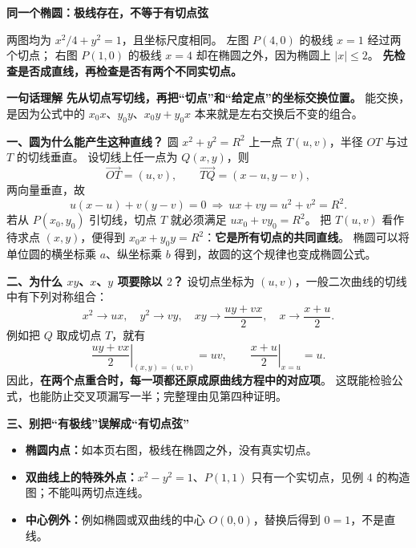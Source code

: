 \begin{explanationbox}
\textbf{\textcolor{CExplanation}{同一个椭圆：极线存在，不等于有切点弦}}

\begin{center}

\end{center}

两图均为 $x^2/4+y^2=1$，且坐标尺度相同。
左图 $P(4,0)$ 的极线 $x=1$ 经过两个切点；
右图 $P(1,0)$ 的极线 $x=4$ 却在椭圆之外，因为椭圆上 $|x|\le2$。
\textbf{先检查是否成直线，再检查是否有两个不同实切点。}

\medskip
\textbf{\textcolor{CExplanation}{一句话理解}}
\textbf{先从切点写切线，再把“切点”和“给定点”的坐标交换位置。}
能交换，是因为公式中的 $x_0x$、$y_0y$、$x_0y+y_0x$ 本来就是左右交换后不变的组合。

\medskip
\begin{minipage}{\linewidth}
\textbf{\textcolor{CExplanation}{一、圆为什么能产生这种直线？}}
圆 $x^2+y^2=R^2$ 上一点 $T(u,v)$，半径 $OT$ 与过 $T$ 的切线垂直。
设切线上任一点为 $Q(x,y)$，则
\[
 \overrightarrow{OT}=(u,v),\qquad
 \overrightarrow{TQ}=(x-u,y-v),
\]
两向量垂直，故
\[
 u(x-u)+v(y-v)=0
 \ \Longrightarrow\ ux+vy=u^2+v^2=R^2.
\]
若从 $P(x_0,y_0)$ 引切线，切点 $T$ 就必须满足 $ux_0+vy_0=R^2$。
把 $T(u,v)$ 看作待求点 $(x,y)$，便得到 $x_0x+y_0y=R^2$：\textbf{它是所有切点的共同直线}。
椭圆可以将单位圆的横坐标乘 $a$、纵坐标乘 $b$ 得到，故圆的这个规律也变成椭圆公式。

\end{minipage}
\par
\medskip
\begin{minipage}{\linewidth}
\textbf{\textcolor{CExplanation}{二、为什么 $xy$、$x$、$y$ 项要除以 $2$？}}
设切点坐标为 $(u,v)$，一般二次曲线的切线中有下列对称组合：
\[
 x^2\longrightarrow ux,\quad
 y^2\longrightarrow vy,\quad
 xy\longrightarrow\frac{uy+vx}{2},\quad
 x\longrightarrow\frac{x+u}{2}.
\]
例如把 $Q$ 取成切点 $T$，就有
\[
 \left.\frac{uy+vx}{2}\right|_{(x,y)=(u,v)}=uv,
 \qquad
 \left.\frac{x+u}{2}\right|_{x=u}=u.
\]
因此，\textbf{在两个点重合时，每一项都还原成原曲线方程中的对应项}。
这既能检验公式，也能防止交叉项漏写一半；完整理由见第四种证明。

\end{minipage}
\par
\medskip
\begin{minipage}{\linewidth}
\textbf{\textcolor{CExplanation}{三、别把“有极线”误解成“有切点弦”}}
\begin{itemize}[leftmargin=*,itemsep=0.35em]
 \item \textbf{椭圆内点：}如本页右图，极线在椭圆之外，没有真实切点。
 \item \textbf{双曲线上的特殊外点：}$x^2-y^2=1$、$P(1,1)$ 只有一个实切点，见例 4 的构造图；不能叫两切点连线。
 \item \textbf{中心例外：}例如椭圆或双曲线的中心 $O(0,0)$，替换后得到 $0=1$，不是直线。
\end{itemize}


\end{minipage}
\end{explanationbox}
